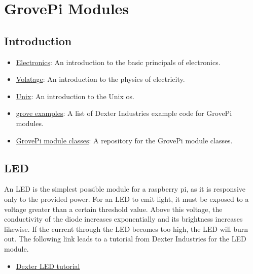 

\chapter{GrovePi Modules}\label{grovepi-modules}

\FILENAME

\section{Introduction}\label{intro}

\begin{itemize}

\item
  \href{http://www.instructables.com/id/Basic-Electronics}{Electronics}:
  An introduction to the basic principals of electronics.
\item
  \href{https://learn.sparkfun.com/tutorials/voltage-current-resistance-and-ohms-law}{Volatage}:
  An introduction to the physics of electricity.
\item
  \href{https://info-ee.eps.surrey.ac.uk/Teaching/Unix/index.html}{Unix}:
  An introduction to the Unix os.
\item
  \href{https://github.com/DexterInd/GrovePi/tree/master/Software/Python}{grove
  examples}: A list of Dexter Industries example code for GrovePi
  modules.
\item
  \href{https://github.com/cloudmesh/cloudmesh.pi/tree/master/cloudmesh/pi}{GrovePi
  module classes}: A repository for the GrovePi module classes.
\end{itemize}

\section{LED}\label{led}

An LED is the simplest possible module for a raspberry pi, as it is
responsive only to the provided power. For an LED to emit light, it must
be exposed to a voltage greater than a certain threshold value. Above
this voltage, the conductivity of the diode increases exponentially and
its brightness increases likewise. If the current through the LED
becomes too high, the LED will burn out. The following link leads to a
tutorial from Dexter Industries for the LED module.

\begin{itemize}

\item
  \href{https://www.dexterindustries.com/GrovePi/projects-for-the-raspberry-pi/raspberry-pi-led-tutorial/}{Dexter
  LED tutorial}
\end{itemize}

